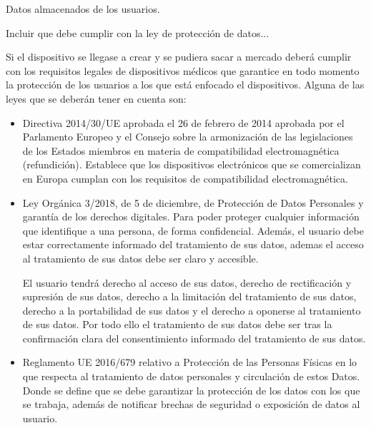 Datos almacenados de los usuarios.

Incluir que debe cumplir con la ley de protección de datos...

Si el dispositivo se llegase a crear y se pudiera sacar a mercado deberá cumplir con los requisitos legales de dispositivos médicos que garantice en todo momento la protección de los usuarios a los que está enfocado el dispositivos. Alguna de las leyes que se deberán tener en cuenta son:
\begin{itemize}
    \item Directiva 2014/30/UE aprobada el 26 de febrero de 2014 aprobada por el Parlamento Europeo y el Consejo sobre la armonización de las legislaciones de los Estados miembros en materia de compatibilidad electromagnética (refundición). Establece que los dispositivos electrónicos que se comercializan en Europa cumplan con los requisitos de compatibilidad electromagnética.
    \item Ley Orgánica 3/2018, de 5 de diciembre, de Protección de Datos Personales y garantía de los derechos digitales. Para poder proteger cualquier información que identifique a una persona, de forma confidencial. Además, el usuario debe estar correctamente informado del tratamiento de sus datos, ademas el acceso al tratamiento de sus datos debe ser claro y accesible.

    El usuario tendrá derecho al acceso de sus datos, derecho de rectificación y supresión de sus datos, derecho a la limitación del tratamiento de sus datos, derecho a la portabilidad de sus datos y el derecho a oponerse al tratamiento de sus datos. Por todo ello el tratamiento de sus datos debe ser tras la confirmación clara del consentimiento informado del tratamiento de sus datos.
    
    \item Reglamento UE 2016/679 relativo a Protección de las Personas Físicas en lo que respecta al tratamiento de datos personales y circulación de estos Datos. Donde se define que se debe garantizar la protección de los datos con los que se trabaja, además de notificar brechas de seguridad o exposición de datos al usuario.


\end{itemize}
